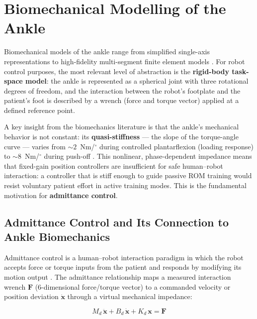 \section{Biomechanical Modelling of the Ankle}

Biomechanical models of the ankle range from simplified single-axis representations to high-fidelity multi-segment finite element models \cite{opensim2024, Malakoutikhah2022}.
For robot control purposes, the most relevant level of abstraction is the \textbf{rigid-body task-space model}: the ankle is represented as a spherical joint with three rotational degrees of freedom, and the interaction between the robot's footplate and the patient's foot is described by a wrench (force and torque vector) applied at a defined reference point.

A key insight from the biomechanics literature is that the ankle's mechanical behavior is not constant: its \textbf{quasi-stiffness} — the slope of the torque-angle curve — varies from $\sim2$~Nm/$^{\circ}$ during controlled plantarflexion (loading response) to $\sim8$~Nm/$^{\circ}$ during push-off \cite{Shamaei2013}.
This nonlinear, phase-dependent impedance means that fixed-gain position controllers are insufficient for safe human–robot interaction: a controller that is stiff enough to guide passive ROM training would resist voluntary patient effort in active training modes.
This is the fundamental motivation for \textbf{admittance control}.

\subsection{Admittance Control and Its Connection to Ankle Biomechanics}

Admittance control is a human–robot interaction paradigm in which the robot accepts force or torque inputs from the patient and responds by modifying its motion output \cite{Li2020passive, Zhang2018}.
The admittance relationship maps a measured interaction wrench $\mathbf{F}$ (6-dimensional force/torque vector) to a commanded velocity or position deviation $\dot{\mathbf{x}}$ through a virtual mechanical impedance:

\begin{equation}
    M_d\,\ddot{\mathbf{x}} + B_d\,\dot{\mathbf{x}} + K_d\,\mathbf{x} = \mathbf{F}
    \label{eq:admittance}
\end{equation}

